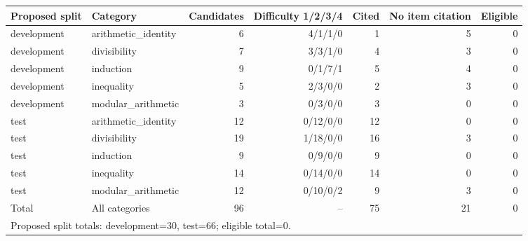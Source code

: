 \begin{tabular}{llrrrrr}
\toprule
Proposed split & Category & Candidates & Difficulty 1/2/3/4 & Cited & No item citation & Eligible\\
\midrule
development & arithmetic\_identity & 6 & 4/1/1/0 & 1 & 5 & 0 \\
development & divisibility & 7 & 3/3/1/0 & 4 & 3 & 0 \\
development & induction & 9 & 0/1/7/1 & 5 & 4 & 0 \\
development & inequality & 5 & 2/3/0/0 & 2 & 3 & 0 \\
development & modular\_arithmetic & 3 & 0/3/0/0 & 3 & 0 & 0 \\
test & arithmetic\_identity & 12 & 0/12/0/0 & 12 & 0 & 0 \\
test & divisibility & 19 & 1/18/0/0 & 16 & 3 & 0 \\
test & induction & 9 & 0/9/0/0 & 9 & 0 & 0 \\
test & inequality & 14 & 0/14/0/0 & 14 & 0 & 0 \\
test & modular\_arithmetic & 12 & 0/10/0/2 & 9 & 3 & 0 \\
\midrule
Total & All categories & 96 & -- & 75 & 21 & 0 \\
\multicolumn{7}{l}{Proposed split totals: development=30, test=66; eligible total=0.} \\
\bottomrule
\end{tabular}
